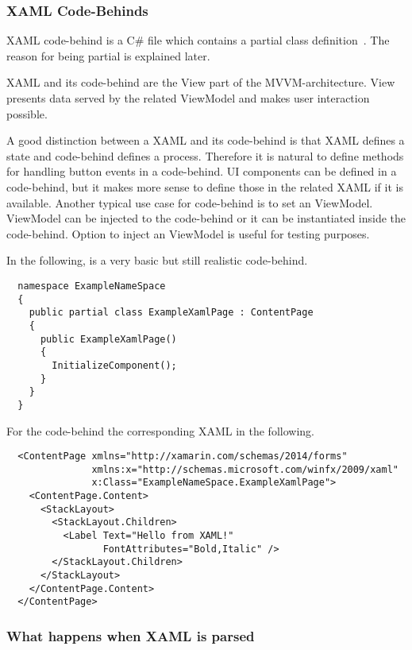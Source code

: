 \documentclass[conference]{IEEEtran}
\begin{document}
\subsubsection{XAML Code-Behinds}

XAML code-behind is a C\# file which contains a partial class definition~\cite{partial}. The reason for being partial is explained later.

XAML and its code-behind are the View part of the MVVM-architecture. View presents data served by the related ViewModel and makes user interaction possible.

A good distinction between a XAML and its code-behind is that XAML defines a state and code-behind defines a process. Therefore it is natural to define methods for handling button events in a code-behind. UI components can be defined in a code-behind, but it makes more sense to define those in the related XAML if it is available. Another typical use case for code-behind is to set an ViewModel. ViewModel can be injected to the code-behind or it can be instantiated inside the code-behind. Option to inject an ViewModel is useful for testing purposes.

In the following, is a very basic but still realistic code-behind.

\begin{lstlisting}
  namespace ExampleNameSpace
  {
    public partial class ExampleXamlPage : ContentPage
    {
      public ExampleXamlPage()
      {
        InitializeComponent();
      }
    }
  }
\end{lstlisting}

For the code-behind the corresponding XAML in the following.

\begin{lstlisting}
  <ContentPage xmlns="http://xamarin.com/schemas/2014/forms"
               xmlns:x="http://schemas.microsoft.com/winfx/2009/xaml"
               x:Class="ExampleNameSpace.ExampleXamlPage">
    <ContentPage.Content>
      <StackLayout>
        <StackLayout.Children>
          <Label Text="Hello from XAML!"
                 FontAttributes="Bold,Italic" />
        </StackLayout.Children>
      </StackLayout>
    </ContentPage.Content>
  </ContentPage>
\end{lstlisting}

\subsubsection{What happens when XAML is parsed}
\end{document}
